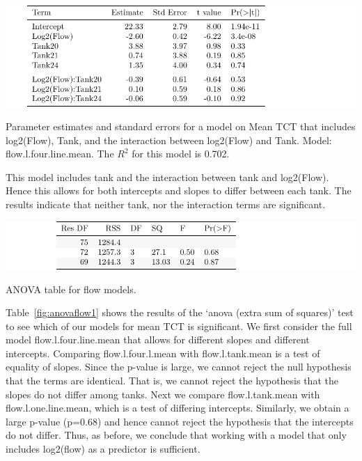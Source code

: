 \begin{table}[H]
\includegraphics{Chapter4Images/lfourlinemean.pdf}
\caption{Parameter estimates and standard errors for a model on Mean TCT that includes log2(Flow), Tank, and the interaction between log2(Flow) and Tank. Model: flow.l.four.line.mean. The $R^{2}$ for this model is 0.702.}
\label{fig:meanflow3}
\end{table}

 This model includes tank and the interaction between tank and log2(Flow). Hence this allows for both intercepts and slopes to differ between each tank. The results indicate that neither tank, nor the interaction terms are significant. 

\vspace{5mm}


\begin{table}[H]
\includegraphics{Chapter4Images/anovameanF.pdf}
\caption{ANOVA table for flow models.}
\label{fig:anovaflow1}
\end{table}


 Table~\ref{fig:anovaflow1} shows the results of the `anova (extra sum of squares)' test to see which of our models for mean TCT is significant. We first consider the full model  flow.l.four.line.mean that allows for different slopes and different intercepts. Comparing flow.l.four.l.mean with flow.l.tank.mean is a test of equality of slopes. Since the p-value is large, we cannot reject the null hypothesis that the terms are identical. That is, we cannot reject the hypothesis that the slopes do not differ among tanks. Next we compare flow.l.tank.mean with flow.l.one.line.mean, which is a test of differing intercepts. Similarly, we obtain a large p-value (p=0.68) and hence cannot reject the hypothesis that the intercepts do not differ. Thus, as before, we conclude that working with a model that only includes log2(flow) as a predictor is sufficient.
















